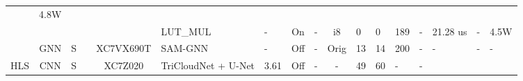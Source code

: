 \documentclass{article}
\begin{document}
\begin{table}
\begin{adjustbox}{totalheight=\baselineskip,}
\begin{tabular}{ccccclp{2em}cp{3em}cp{2em}p{4em}p{3em}p{3.5em}p{3.5em}p{2.5em}p{3em}}
                                                               &\multirow{1}{*}{4.8W}\\
   &   &   &   &   &\multirow{1}{*}{LUT\_MUL}
                       &\multirow{1}{*}{-}
                           &\multirow{1}{*}{On}
                               &\multirow{1}{*}{-}
                                   &\multirow{1}{*}{i8}
                                       &\multirow{1}{*}{0}
                                           &\multirow{1}{*}{0}
                                               &\multirow{1}{*}{189}
                                                   &\multirow{1}{*}{-}
                                                       &\multirow{1}{*}{21.28 us}
                                                           &\multirow{1}{*}{-}
                                                               &\multirow{1}{*}{4.5W}\\
\cmidrule{2-17}
   &\multirow{1}{*}{GNN}
       &\multirow{1}{*}{S}
           &\multirow{1}{*}{\cite{chellaswamyFPGAbasedRemoteTarget2024}}
               &\multirow{1}{*}{XC7VX690T}
                   &\multirow{1}{*}{SAM-GNN}
                       &\multirow{1}{*}{-}
                           &\multirow{1}{*}{Off}
                               &\multirow{1}{*}{-}
                                   &\multirow{1}{*}{Orig}
                                       &\multirow{1}{*}{13}
                                           &\multirow{1}{*}{14}
                                               &\multirow{1}{*}{200}
                                                   &\multirow{1}{*}{-}
                                                       &\multirow{1}{*}{-}
                                                           &\multirow{1}{*}{-}
                                                               &\multirow{1}{*}{-}\\
\cmidrule{1-17}
\multirow{11}{*}{HLS}
   &\multirow{8}{*}{CNN}
       &\multirow{5}{*}{S}
           &\multirow{1}{*}{\cite{kimOnOrbitAICloud2024}}
               &\multirow{1}{*}{XC7Z020}
                   &\multirow{1}{*}{TriCloudNet + U-Net}
                       &\multirow{1}{*}{3.61}
                           &\multirow{1}{*}{Off}
                               &\multirow{1}{*}{-}
                                   &\multirow{1}{*}{-}
                                       &\multirow{1}{*}{49}
                                           &\multirow{1}{*}{60}
                                               &\multirow{1}{*}{-}
                                                   &\multirow{1}{*}{-}

\end{tabular}
\end{adjustbox}
\end{table}
\end{document}

